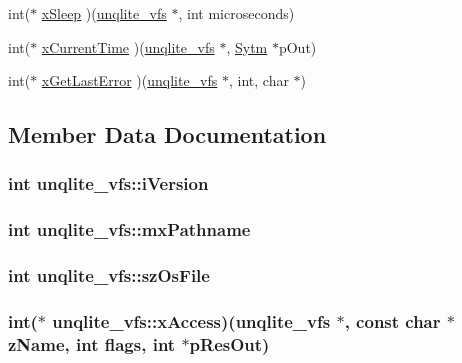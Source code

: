 \begin{DoxyCompactItemize}
\item 
int($\ast$ \hyperlink{structunqlite__vfs_a3d7d751cb9284864ba562a4ef395510e}{x\-Sleep} )(\hyperlink{structunqlite__vfs}{unqlite\-\_\-vfs} $\ast$, int microseconds)
\item 
int($\ast$ \hyperlink{structunqlite__vfs_a2fd9fc0c455d92227d516f013bdd65a3}{x\-Current\-Time} )(\hyperlink{structunqlite__vfs}{unqlite\-\_\-vfs} $\ast$, \hyperlink{struct_sytm}{Sytm} $\ast$p\-Out)
\item 
int($\ast$ \hyperlink{structunqlite__vfs_a1a54114bc39a46dbbc91a55fb2e551f9}{x\-Get\-Last\-Error} )(\hyperlink{structunqlite__vfs}{unqlite\-\_\-vfs} $\ast$, int, char $\ast$)
\end{DoxyCompactItemize}


\subsection{Member Data Documentation}
\hypertarget{structunqlite__vfs_afd249993dc763d713902629c67118a1a}{
\subsubsection[{i\-Version}]{\setlength{\rightskip}{0pt plus 5cm}int unqlite\-\_\-vfs\-::i\-Version}}\label{d5/d07/structunqlite__vfs_afd249993dc763d713902629c67118a1a}
\hypertarget{structunqlite__vfs_a06f5a5213f2a885826351ba8a8e653b8}{
\subsubsection[{mx\-Pathname}]{\setlength{\rightskip}{0pt plus 5cm}int unqlite\-\_\-vfs\-::mx\-Pathname}}\label{d5/d07/structunqlite__vfs_a06f5a5213f2a885826351ba8a8e653b8}
\hypertarget{structunqlite__vfs_a7a0d077540d8ea96372383b4b288dca2}{
\subsubsection[{sz\-Os\-File}]{\setlength{\rightskip}{0pt plus 5cm}int unqlite\-\_\-vfs\-::sz\-Os\-File}}\label{d5/d07/structunqlite__vfs_a7a0d077540d8ea96372383b4b288dca2}
\hypertarget{structunqlite__vfs_a3d8d2a74a38438995cbf4591aa18cad7}{
\subsubsection[{x\-Access}]{\setlength{\rightskip}{0pt plus 5cm}int($\ast$ unqlite\-\_\-vfs\-::x\-Access)({\bf unqlite\-\_\-vfs} $\ast$, const char $\ast${\bf z\-Name}, int flags, int $\ast$p\-Res\-Out)}}\label{d5/d07/structunqlite__vfs_a3d8d2a74a38438995cbf4591aa18cad7}
